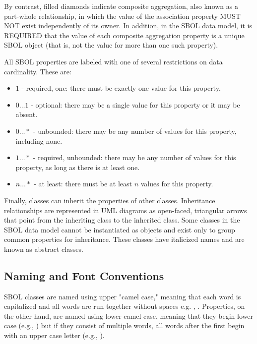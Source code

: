 By contrast, filled diamonds indicate composite aggregation, also known as a part-whole relationship, in which the value of the association property MUST NOT exist independently of its owner. In addition, in the SBOL data model, it is REQUIRED that the value of each composite aggregation property is a unique SBOL object (that is, not the value for more than one such property).

All SBOL properties are labeled with one of several restrictions on data cardinality. These are:

\begin{itemize}

\item $1$ - required, one: there must be exactly one value for this property.

\item $0 \ldots 1$ - optional: there may be a single value for this property or it may be absent.

\item $0 \ldots *$ - unbounded: there may be any number of values for this property, including none.

\item $1 \ldots *$ - required, unbounded: there may be any number of values for this property, as long as there is at least one.

\item $n \ldots *$ - at least: there must be at least $n$ values for this property.

\end{itemize}

Finally, classes can inherit the properties of other classes. Inheritance relationships are represented in UML diagrams as open-faced, triangular arrows that point from the inheriting class to the inherited class. Some classes in the SBOL data model cannot be instantiated as objects and exist only to group common properties for inheritance. These classes have italicized names and are known as abstract classes.

\subsection{Naming and Font Conventions}
\label{sec:nameconventions}

SBOL classes are named using upper "camel case," meaning that each word is capitalized and all words are run together without spaces e.g. , .  
Properties, on the other hand, are named using lower camel case, meaning that they begin lower case (e.g., ) but if they consist of multiple words, all words after the first begin with an upper case letter (e.g., ).


